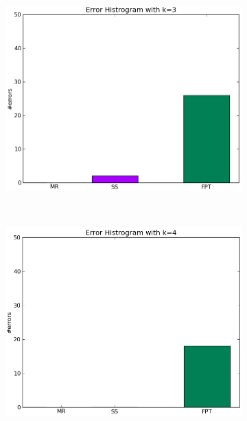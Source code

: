 \documentclass[compressed,final,notitlepage,narroweqnarray,inline,twoside,]{ieee}
\begin{document}
\begin{figure}
\begin{subfigure}[b]{0.23\textwidth}
                \label{fig:tiger}
        \end{subfigure}
        ~ 
        \begin{subfigure}[b]{0.24\textwidth}
                \includegraphics[width=\textwidth]{../images/Accuracy_k3}
                \label{fig:mouse}
        \end{subfigure}%
        ~ 
        \begin{subfigure}[b]{0.24\textwidth}
                \includegraphics[width=\textwidth]{../images/Accuracy_k4}
                \label{fig:tiger}
        \end{subfigure}
        \vspace{-20pt} 
        \caption{}
        \label{fig:histograms}
\end{figure}
\end{document}
